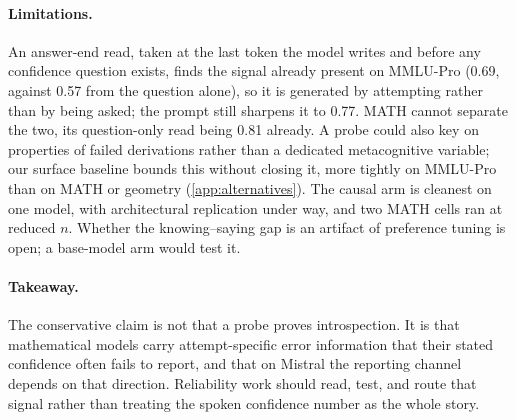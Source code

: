 \documentclass{article}
\begin{document}
\paragraph{Limitations.}
An answer-end read, taken at the last token the model writes and before any confidence question exists, finds the signal already present on MMLU-Pro (0.69, against 0.57 from the question alone), so it is generated by attempting rather than by being asked; the prompt still sharpens it to 0.77. MATH cannot separate the two, its question-only read being 0.81 already.
A probe could also key on properties of failed derivations rather than a dedicated metacognitive variable; our surface baseline bounds this without closing it, more tightly on MMLU-Pro than on MATH or geometry (\cref{app:alternatives}).
The causal arm is cleanest on one model, with architectural replication under way, and two MATH cells ran at reduced $n$.
Whether the knowing--saying gap is an artifact of preference tuning is open; a base-model arm would test it.

\paragraph{Takeaway.}
The conservative claim is not that a probe proves introspection.
It is that mathematical models carry attempt-specific error information that their stated confidence often fails to report, and that on Mistral the reporting channel depends on that direction.
Reliability work should read, test, and route that signal rather than treating the spoken confidence number as the whole story.





\appendix
{}

\end{document}
